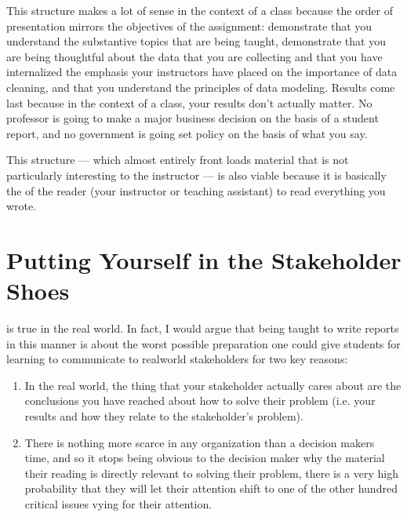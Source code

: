 \documentclass[letterpaper,10pt,english]{jupyterBook}
\begin{document}
\sphinxAtStartPar
This structure makes a lot of sense in the context of a class because the order of presentation mirrors the objectives of the assignment: demonstrate that you understand the substantive topics that are being taught, demonstrate that you are being thoughtful about the data that you are collecting and that you have internalized the emphasis your instructors have placed on the importance of data cleaning, and that you understand the principles of data modeling. Results come last because in the context of a class, your results don’t actually matter. No professor is going to make a major business decision on the basis of a student report, and no government is going set policy on the basis of what you say.

\sphinxAtStartPar
This structure — which almost entirely front loads material that is not particularly interesting to the instructor — is also viable because it is basically the  of the reader (your instructor or teaching assistant) to read everything you wrote.


\section{Putting Yourself in the Stakeholder Shoes}
\label{\detokenize{40_in_practice/25_writing_to_stakeholders:putting-yourself-in-the-stakeholder-shoes}}
\sphinxAtStartPar
{} is true in the real world. In fact, I would argue that being taught to write reports in this manner is about the worst possible preparation one could give students for learning to communicate to real\sphinxhyphen{}world stakeholders for two key reasons:
\begin{enumerate}
%
\item {} 
\sphinxAtStartPar
In the real world, the  thing that your stakeholder actually cares about are the conclusions you have reached about how to solve their problem (i.e. your results and how they relate to the stakeholder’s problem).

\item {} 
\sphinxAtStartPar
There is nothing more scarce in any organization than a decision makers time, and so  it stops being obvious to the decision maker why the material their reading is directly relevant to solving their problem, there is a very high probability that they will let their attention shift to one of the other hundred critical issues vying for their attention.

\end{enumerate}
\end{document}
